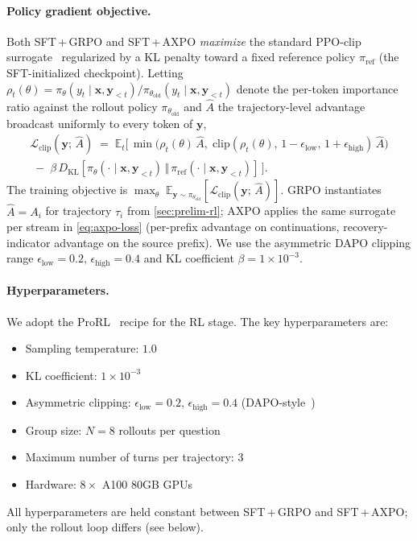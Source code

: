 \documentclass{llmxive}
\providecommand{\bm}[1]{\boldsymbol{#1}}
\providecommand{\vx}{{\bm{x}}}
\providecommand{\vy}{{\bm{y}}}
\begin{document}
\paragraph{Policy gradient objective.}
\label{app:clip-objective}
Both SFT\,+\,GRPO and SFT\,+\,AXPO \emph{maximize} the standard PPO-clip surrogate~\citep{PPO} regularized by a KL penalty toward a fixed reference policy $\pi_{\text{ref}}$ (the SFT-initialized checkpoint). Letting $\rho_t(\theta) = \pi_\theta(y_t \mid \vx, \vy_{<t}) / \pi_{\theta_{\text{old}}}(y_t \mid \vx, \vy_{<t})$ denote the per-token importance ratio against the rollout policy $\pi_{\theta_{\text{old}}}$ and $\hat{A}$ the trajectory-level advantage broadcast uniformly to every token of $\vy$,
\begin{gather}
\label{eq:clip-app}
    \mathcal{L}_{\text{clip}}(\vy;\, \hat{A}) \;=\; \mathbb{E}_{t}\!\big[\, \min\!\bigl(\rho_t(\theta)\, \hat{A},\; \mathrm{clip}(\rho_t(\theta),\, 1-\epsilon_{\text{low}},\, 1+\epsilon_{\text{high}})\, \hat{A}\bigr) \\
    \;-\; \beta\, D_{\mathrm{KL}}\!\left[\pi_\theta(\cdot \mid \vx, \vy_{<t}) \,\Vert\, \pi_{\text{ref}}(\cdot \mid \vx, \vy_{<t})\right] \,\big]. \nonumber
\end{gather}
The training objective is $\max_\theta\; \mathbb{E}_{\vy \sim \pi_{\theta_{\text{old}}}}\!\left[\mathcal{L}_{\text{clip}}(\vy;\, \hat{A})\right]$. GRPO instantiates $\hat{A} = A_i$ for trajectory $\tau_i$ from \autoref{sec:prelim-rl}; AXPO applies the same surrogate per stream in \autoref{eq:axpo-loss} (per-prefix advantage on continuations, recovery-indicator advantage on the source prefix). We use the asymmetric DAPO clipping range $\epsilon_{\text{low}} = 0.2,\, \epsilon_{\text{high}} = 0.4$ and KL coefficient $\beta = 1\times 10^{-3}$.

\paragraph{Hyperparameters.}
We adopt the ProRL~\citep{prorl} recipe for the RL stage. The key hyperparameters are:
\begin{itemize}[leftmargin=*, itemsep=2pt]
    \item Sampling temperature: $1.0$
    \item KL coefficient: $1\times 10^{-3}$
    \item Asymmetric clipping: $\epsilon_{\text{low}} = 0.2$, $\epsilon_{\text{high}} = 0.4$ (DAPO-style~\citep{DAPO})
    \item Group size: $N = 8$ rollouts per question
    \item Maximum number of turns per trajectory: $3$
    \item Hardware: $8 \times$ A100 80GB GPUs
\end{itemize}
All hyperparameters are held constant between SFT\,+\,GRPO and SFT\,+\,AXPO; only the rollout loop differs (see below).
\end{document}
